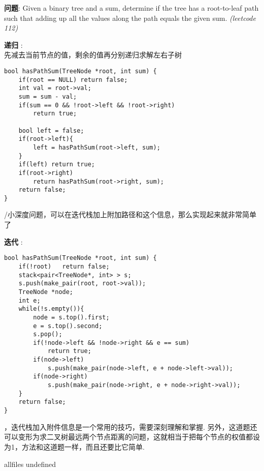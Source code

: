 \documentclass{article}
\begin{document}
\begin{CJK}{UTF8}{gbsn}     %

\else
	
\begin{description}
	\item{\textbf{问题}}: Given a binary tree and a sum, determine if the tree has a root-to-leaf path such that adding up all the values along the path equals the given sum. \textit{(leetcode 112)}
	\item{\textbf{递归}} : 
	\\先减去当前节点的值，剩余的值再分别递归求解左右子树
	\begin{lstlisting}
bool hasPathSum(TreeNode *root, int sum) {
	if(root == NULL) return false;
	int val = root->val;
	sum = sum - val;
	if(sum == 0 && !root->left && !root->right)
		return true;

	bool left = false; 
	if(root->left){
		left = hasPathSum(root->left, sum);	
	}
	if(left) return true;
	if(root->right)
		return hasPathSum(root->right, sum);
	return false;
}
	\end{lstlisting}
	/小深度问题，可以在迭代栈加上附加路径和这个信息，那么实现起来就非常简单了
	\item{\textbf{迭代}} : 
	\begin{lstlisting}
bool hasPathSum(TreeNode *root, int sum) {
	if(!root)	return false;
	stack<pair<TreeNode*, int> > s;
	s.push(make_pair(root, root->val));
	TreeNode *node;
	int e;
	while(!s.empty()){
		node = s.top().first;
		e = s.top().second;
		s.pop();
		if(!node->left && !node->right && e == sum)
			return true;
		if(node->left)
			s.push(make_pair(node->left, e + node->left->val));
		if(node->right)
			s.push(make_pair(node->right, e + node->right->val));
	}
	return false;
}
	\end{lstlisting}
	，迭代栈加入附件信息是一个常用的技巧，需要深刻理解和掌握. 另外，这道题还可以变形为求二叉树最远两个节点距离的问题，这就相当于把每个节点的权值都设为1，方法和这道题一样，而且还要比它简单.
\end{description}

\fi

\ifx allfiles undefined
\end{CJK}
\end{document}
